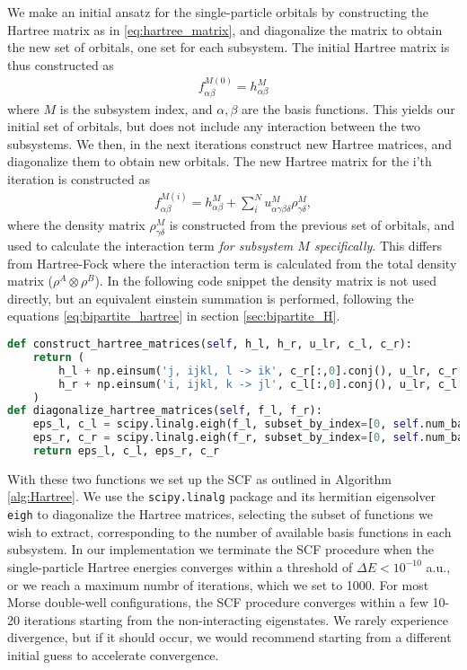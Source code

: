 \documentclass{subfiles}
\begin{document}
We make an initial ansatz for the single-particle orbitals by constructing the Hartree matrix as in \eqref{eq:hartree_matrix}, and diagonalize the matrix to obtain the new set of orbitals, one set for each subsystem. The initial Hartree matrix is thus constructed as
\begin{align*}
    f_{\alpha\beta}^{M(0)} = h_{\alpha\beta}^M
\end{align*}
where $M$ is the subsystem index, and $\alpha, \beta$ are the basis functions. This yields our initial set of orbitals, but does not include any interaction between the two subsystems. We then, in the next iterations construct new Hartree matrices, and diagonalize them to obtain new orbitals. The new Hartree matrix for the i'th iteration is constructed as
\begin{align*}
    f_{\alpha\beta}^{M(i)} = h_{\alpha\beta}^M + \sum_{i}^{N} u_{\alpha\gamma\beta\delta}^{M} \rho_{\gamma\delta}^{M},
\end{align*}
where the density matrix $\rho_{\gamma\delta}^{M}$ is constructed from the previous set of orbitals, and used to calculate the interaction term \emph{for subsystem $M$ specifically}. This differs from Hartree-Fock where the interaction term is calculated from the total density matrix ($\rho^A\otimes\rho^B$). In the following code snippet the density matrix is not used directly, but an equivalent einstein summation is performed, following the equations \eqref{eq:bipartite_hartree} in section \ref{sec:bipartite_H}.
\begin{lstlisting}[language=Python]
def construct_hartree_matrices(self, h_l, h_r, u_lr, c_l, c_r):
    return (
        h_l + np.einsum('j, ijkl, l -> ik', c_r[:,0].conj(), u_lr, c_r[:,0]),
        h_r + np.einsum('i, ijkl, k -> jl', c_l[:,0].conj(), u_lr, c_l[:,0]),
    )
def diagonalize_hartree_matrices(self, f_l, f_r):
    eps_l, c_l = scipy.linalg.eigh(f_l, subset_by_index=[0, self.num_basis_l - 1])
    eps_r, c_r = scipy.linalg.eigh(f_r, subset_by_index=[0, self.num_basis_r - 1])
    return eps_l, c_l, eps_r, c_r
\end{lstlisting}
With these two functions we set up the SCF as outlined in Algorithm \ref{alg:Hartree}. We use the \texttt{scipy.linalg}\cite{2020SciPy-NMeth} package and its hermitian eigensolver \texttt{eigh} to diagonalize the Hartree matrices, selecting the subset of functions we wish to extract, corresponding to the number of available basis functions in each subsystem. In our implementation we terminate the SCF procedure when the single-particle Hartree energies converges within a threshold of $\Delta E < 10^{-10}$ a.u., or we reach a maximum numbr of iterations, which we set to 1000. For most Morse double-well configurations, the SCF procedure converges within a few 10-20 iterations starting from the non-interacting eigenstates. We rarely experience divergence, but if it should occur, we would recommend starting from a different initial guess to accelerate convergence. 
\end{document}
